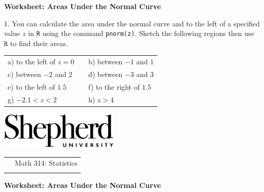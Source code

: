 \documentclass[10pt]{article}
\begin{document}
{\setlength{\baselineskip}{1.05\baselineskip}
\begin{center}
\textbf{\large  Worksheet:  Areas Under the Normal Curve}
\end{center}

\newcommand{\Z}{\hphantom{0}}
1. You can calculate the area under the normal curve and to the left of a specified value
$z$ in \texttt{R} using the command \texttt{pnorm(z)}.  Sketch the following regions then
use $\texttt{R}$ to find their areas.\vspace{-4pt}
\begin{center}
\begin{tabular}{lcl}
a) to the left of $z=0$ &\hspace{3in} & b) between $-1$ and $1$\\[.7in]
c) between $-2$ and $2$ &\hspace{3in} & d) between $-3$ and $3$\\[.7in]
e) to the left of $1.5$ &\hspace{3in} & f) to the right of $1.5$\\[.7in]
g) $-2.1<z<2$ &\hspace{3in} & h) $z>4$\\[.5in]
\end{tabular}
\end{center}
\vfill


\href{http://www.shepherd.edu}{\includegraphics[height=1.75cm]{logo-high-res.eps}}
\vspace{-1.69cm}

{\small
\begin{tabular}{cl}
\hspace{5in} & Math 314:  Statistics\\
                & %
\end{tabular}
}
\medskip

\begin{center}
\textbf{\large  Worksheet:  Areas Under the Normal Curve}
\end{center}

}
\end{document}
